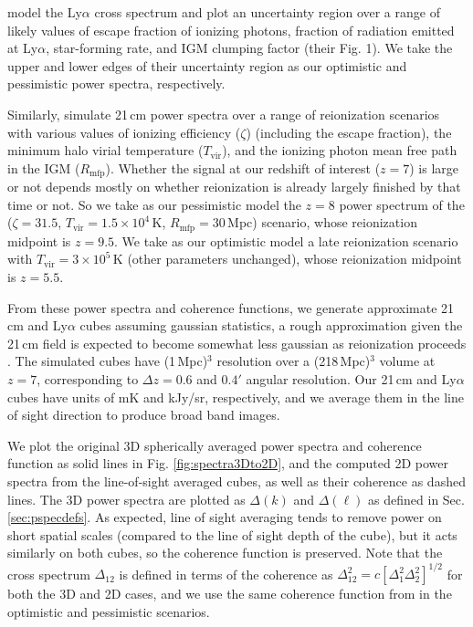 \documentclass[numberedappendix]{emulateapj}
\begin{document}
\citet{Gong2014} model the Ly$\alpha$ cross spectrum and plot an uncertainty region over a range of likely values of escape fraction of ionizing photons, fraction of radiation emitted at Ly$\alpha$, star-forming rate, and IGM clumping factor (their Fig. 1). We take the upper and lower edges of their uncertainty region as our optimistic and pessimistic power spectra, respectively. 

Similarly, \citet{PoberNextGen} simulate 21\,cm power spectra over a range of reionization scenarios with various values of ionizing efficiency ($\zeta$) (including the escape fraction), the minimum halo virial temperature ($T_\text{vir}$), and the ionizing photon mean free path in the IGM ($R_\text{mfp}$). Whether the signal at our redshift of interest ($z=7$) is large or not depends mostly on whether reionization is already largely finished by that time or not. So we take as our pessimistic model the $z=8$ power spectrum of the ($\zeta =31.5$, $T_\text{vir}=1.5\times10^4$\,K, $R_\text{mfp}=30$\,Mpc) scenario, whose reionization midpoint is $z=9.5$. We take as our optimistic model a late reionization scenario with $T_\text{vir}=3\times10^5$\,K (other parameters unchanged), whose reionization midpoint is $z=5.5$. 

From these power spectra and coherence functions, we generate approximate 21\,cm and Ly$\alpha$ cubes assuming gaussian statistics, a rough approximation given the 21\,cm field is expected to become somewhat less  gaussian as reionization proceeds \citep{skew}. The simulated cubes have (1\,Mpc)$^3$ resolution over a (218\,Mpc)$^3$ volume at $z=7$, corresponding to $\Delta z=0.6$ and $0.4'$ angular resolution. Our 21\,cm and Ly$\alpha$ cubes have units of mK and kJy/sr, respectively, and we average them in the line of sight direction to produce broad band images.

We plot the original 3D spherically averaged power spectra and coherence function as solid lines in Fig. \ref{fig:spectra3Dto2D}, and the computed 2D power spectra from the line-of-sight averaged cubes, as well as their coherence as dashed lines. The 3D power spectra are plotted as $\Delta(k)$ and $\Delta(\ell)$ as defined in Sec. \ref{sec:pspecdefs}. As expected, line of sight averaging tends to remove power on short spatial scales (compared to the line of sight depth of the cube), but it acts similarly on both cubes, so the coherence function is preserved. Note that the cross spectrum $\Delta_{12}$ is defined in terms of the coherence as $\Delta^2_{12}=c[\Delta^2_1\Delta_2^2]^{1/2}$ for both the 3D and 2D cases, and we use the same coherence function from \citet{Heneka2016} in the optimistic and pessimistic scenarios.
\end{document}
